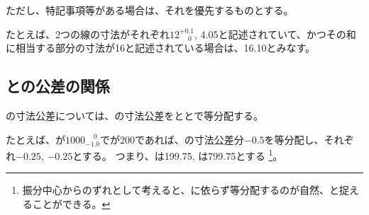 ただし、特記事項等がある場合は、それを優先するものとする。
\begin{hosoku}
たとえば、2つの線の寸法がそれぞれ$12^{+0.1}_{\phantom -0}$, 4.05と記述されていて、かつその和に相当する部分の寸法が16と記述されている場合は、16.10とみなす。
\end{hosoku}



\clearpage


\subsection{\WorkTotalLength と\AlocationLength の公差の関係}
\AlocationLength の寸法公差については、\WorkTotalLength の寸法公差を\TopAlocationLength と\BottomAlocationLength とで等分配する。
\begin{hosoku}
たとえば、\WorkTotalLength が$1000^{\phantom +0}_{-1.0}$で\TopAlocationLength が200であれば、\WorkTotalLength の寸法公差分$-0.5$を等分配し、それぞれ$-0.25$, $-0.25$とする。
つまり、\TopAlocationLength は199.75, \BottomAlocationLength は799.75とする
\footnote{振分中心からのずれとして考えると、\AlocationLength に依らず等分配するのが自然、と捉えることができる。}。
\end{hosoku}



